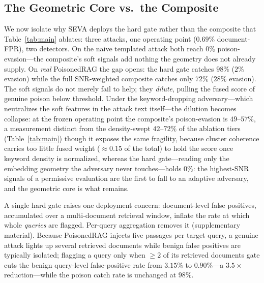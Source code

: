 \documentclass[10pt,journal,compsoc]{IEEEtran}
\begin{document}
\subsection{The Geometric Core vs.\ the Composite}
\label{subsec:core}
We now isolate why SEVA deploys the hard gate rather than the
composite that Table~\ref{tab:main} ablates: three attacks, one operating point
($0.69\%$ document-FPR), two detectors. On the naive templated attack both reach
$0\%$ poison-evasion---the composite's soft signals add nothing the geometry does not
already supply. On \emph{real} PoisonedRAG the gap opens: the hard gate catches $98\%$
($2\%$ evasion) while the full SNR-weighted composite catches only $72\%$ ($28\%$ evasion).
The soft signals do not merely fail to help; they \emph{dilute}, pulling the fused
score of genuine poison below threshold.
Under the keyword-dropping adversary---which neutralizes the soft features in the attack
text itself---the dilution becomes collapse: at the frozen operating point the composite's
poison-evasion is $49$--$57\%$, a measurement distinct from the
density-swept $42$--$72\%$ of the ablation tiers (Table~\ref{tab:main}) though it exposes the
same fragility, because cluster coherence carries too little fused weight
($\approx\!0.15$ of the total) to hold the score once keyword density is normalized,
whereas the hard gate---reading only the embedding geometry the adversary never
touches---holds $0\%$: the highest-SNR signals of a permissive evaluation are the
first to fall to an adaptive adversary, and the geometric core is what remains.

A single hard gate raises one deployment concern: document-level false positives,
accumulated over a multi-document retrieval window, inflate the rate at which whole
\emph{queries} are flagged. Per-query aggregation removes it (supplementary material).
Because PoisonedRAG injects five passages per target query, a genuine
attack lights up several retrieved documents while benign false positives are
typically isolated; flagging a query only when $\geq\!2$ of its retrieved documents
gate cuts the benign query-level false-positive rate from $3.15\%$ to
$0.90\%$---a $3.5\times$ reduction---while the poison catch rate is unchanged at
$98\%$.
\end{document}
